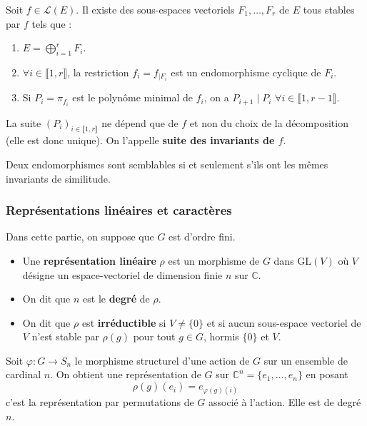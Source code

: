  \begin{theorem}[Frobenius]
    Soit $f \in \mathcal{L}(E)$. Il existe des sous-espaces vectoriels $F_1, \dots, F_r$ de $E$ tous stables par $f$ tels que :
    \begin{enumerate}[label=(\roman*)]
      \item $E = \bigoplus_{i = 1}^r F_i$.
      \item $\forall i \in \llbracket 1, r \rrbracket$, la restriction $f_i = f_{|F_i}$ est un endomorphisme cyclique de $F_i$.
      \item Si $P_i = \pi_{f_i}$ est le polynôme minimal de $f_i$, on a $P_{i+1} \mid P_i$ $\forall i \in \llbracket 1, r-1 \rrbracket$.
    \end{enumerate}
    La suite $(P_i)_{i \in \llbracket 1, r \rrbracket}$ ne dépend que de $f$ et non du choix de la décomposition (elle est donc unique). On l'appelle \textbf{suite des invariants de $f$}.
  \end{theorem}

  \begin{corollary}
    Deux endomorphismes sont semblables si et seulement s'ils ont les mêmes invariants de similitude.
  \end{corollary}

  \subsubsection{Représentations linéaires et caractères}


  Dans cette partie, on suppose que $G$ est d'ordre fini.

  \begin{definition}
    \begin{itemize}
      \item Une \textbf{représentation linéaire} $\rho$ est un morphisme de $G$ dans $\mathrm{GL}(V)$ où $V$ désigne un espace-vectoriel de dimension finie $n$ sur $\mathbb{C}$.
      \item On dit que $n$ est le \textbf{degré} de $\rho$.
      \item On dit que $\rho$ est \textbf{irréductible} si $V \neq \{ 0 \}$ et si aucun sous-espace vectoriel de $V$ n'est stable par $\rho(g)$ pour tout $g \in G$, hormis $\{ 0 \}$ et $V$.
    \end{itemize}
  \end{definition}

  \begin{example}
    Soit $\varphi : G \rightarrow S_n$ le morphisme structurel d'une action de $G$ sur un ensemble de cardinal $n$. On obtient une représentation de $G$ sur $\mathbb{C}^n = \{ e_1, \dots, e_n \}$ en posant
    \[ \rho(g)(e_i) = e_{\varphi(g)(i)} \]
    c'est la représentation par permutations de $G$ associé à l'action. Elle est de degré $n$.
  \end{example}

